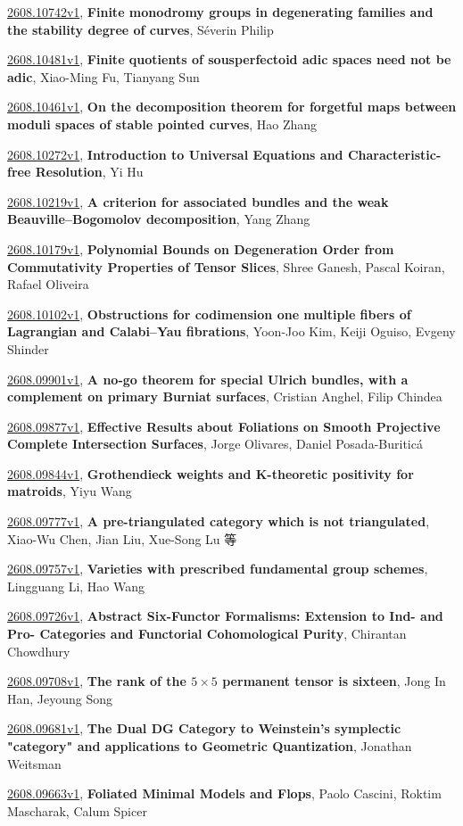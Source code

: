 \documentclass[9pt, a4paper]{article}
\theoremstyle{plain}
\theoremstyle{definition}
\theoremstyle{remark}
\newcommand{\arxiv}[3]{\href{https://arxiv.org/abs/#1}{#1}, \textbf{\textcolor{arxivblue}{#2}}, #3}
\begin{document}
\arxiv{2608.10742v1}{Finite monodromy groups in degenerating families and the stability degree of curves}{Séverin Philip}

\arxiv{2608.10481v1}{Finite quotients of sousperfectoid adic spaces need not be adic}{Xiao-Ming Fu, Tianyang Sun}

\arxiv{2608.10461v1}{On the decomposition theorem for forgetful maps between moduli spaces of stable pointed curves}{Hao Zhang}

\arxiv{2608.10272v1}{Introduction to Universal Equations and Characteristic-free Resolution}{Yi Hu}

\arxiv{2608.10219v1}{A criterion for associated bundles and the weak Beauville--Bogomolov decomposition}{Yang Zhang}

\arxiv{2608.10179v1}{Polynomial Bounds on Degeneration Order from Commutativity Properties of Tensor Slices}{Shree Ganesh, Pascal Koiran, Rafael Oliveira}

\arxiv{2608.10102v1}{Obstructions for codimension one multiple fibers of Lagrangian and Calabi--Yau fibrations}{Yoon-Joo Kim, Keiji Oguiso, Evgeny Shinder}

\arxiv{2608.09901v1}{A no-go theorem for special Ulrich bundles, with a complement on primary Burniat surfaces}{Cristian Anghel, Filip Chindea}

\arxiv{2608.09877v1}{Effective Results about Foliations on Smooth Projective Complete Intersection Surfaces}{Jorge Olivares, Daniel Posada-Buriticá}

\arxiv{2608.09844v1}{Grothendieck weights and K-theoretic positivity for matroids}{Yiyu Wang}

\arxiv{2608.09777v1}{A pre-triangulated category which is not triangulated}{Xiao-Wu Chen, Jian Liu, Xue-Song Lu 等}

\arxiv{2608.09757v1}{Varieties with prescribed fundamental group schemes}{Lingguang Li, Hao Wang}

\arxiv{2608.09726v1}{Abstract Six-Functor Formalisms: Extension to Ind- and Pro- Categories and Functorial Cohomological Purity}{Chirantan Chowdhury}

\arxiv{2608.09708v1}{The rank of the $5\times 5$ permanent tensor is sixteen}{Jong In Han, Jeyoung Song}

\arxiv{2608.09681v1}{The Dual DG Category to Weinstein's symplectic "category" and applications to Geometric Quantization}{Jonathan Weitsman}

\arxiv{2608.09663v1}{Foliated Minimal Models and Flops}{Paolo Cascini, Roktim Mascharak, Calum Spicer}
\end{document}
